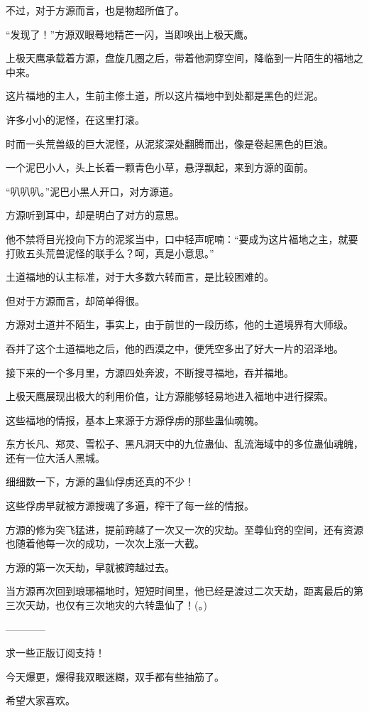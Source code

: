 \begin{this_body}
不过，对于方源而言，也是物超所值了。

“发现了！”方源双眼蓦地精芒一闪，当即唤出上极天鹰。

上极天鹰承载着方源，盘旋几圈之后，带着他洞穿空间，降临到一片陌生的福地之中来。

这片福地的主人，生前主修土道，所以这片福地中到处都是黑色的烂泥。

许多小小的泥怪，在这里打滚。

时而一头荒兽级的巨大泥怪，从泥浆深处翻腾而出，像是卷起黑色的巨浪。

一个泥巴小人，头上长着一颗青色小草，悬浮飘起，来到方源的面前。

“叭叭叭。”泥巴小黑人开口，对方源道。

方源听到耳中，却是明白了对方的意思。

他不禁将目光投向下方的泥浆当中，口中轻声呢喃：“要成为这片福地之主，就要打败五头荒兽泥怪的联手么？呵，真是小意思。”

土道福地的认主标准，对于大多数六转而言，是比较困难的。

但对于方源而言，却简单得很。

方源对土道并不陌生，事实上，由于前世的一段历练，他的土道境界有大师级。

吞并了这个土道福地之后，他的西漠之中，便凭空多出了好大一片的沼泽地。

接下来的一个多月里，方源四处奔波，不断搜寻福地，吞并福地。

上极天鹰展现出极大的利用价值，让方源能够轻易地进入福地中进行探索。

这些福地的情报，基本上来源于方源俘虏的那些蛊仙魂魄。

东方长凡、郑灵、雪松子、黑凡洞天中的九位蛊仙、乱流海域中的多位蛊仙魂魄，还有一位大活人黑城。

细细数一下，方源的蛊仙俘虏还真的不少！

这些俘虏早就被方源搜魂了多遍，榨干了每一丝的情报。

方源的修为突飞猛进，提前跨越了一次又一次的灾劫。至尊仙窍的空间，还有资源也随着他每一次的成功，一次次上涨一大截。

方源的第一次天劫，早就被跨越过去。

当方源再次回到琅琊福地时，短短时间里，他已经是渡过二次天劫，距离最后的第三次天劫，也仅有三次地灾的六转蛊仙了！(。)

------------

求一些正版订阅支持！

今天爆更，爆得我双眼迷糊，双手都有些抽筋了。

希望大家喜欢。


\end{this_body}
